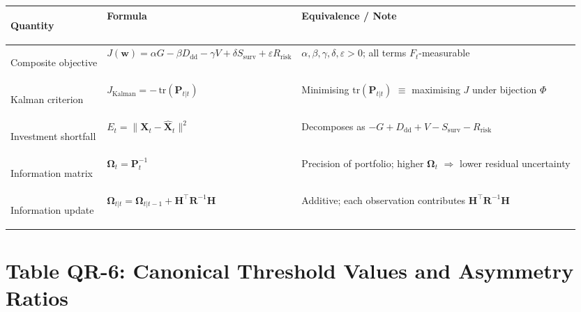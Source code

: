 \documentclass[12pt,openany]{book}
\newcommand{\bfOmega}{\boldsymbol{\Omega}}
\numberwithin{equation}{chapter}
\theoremstyle{plain}
\theoremstyle{definition}
\theoremstyle{remark}
\renewcommand{\arraystretch}{1.2}
\def\mathcal#1{#1}%
\begin{document}
\begin{center}
\small
\renewcommand{\arraystretch}{1.40}
\begin{tabularx}{\linewidth}{@{}
  >{\bfseries\raggedright\arraybackslash}p{3.2cm}
  >{\raggedright\arraybackslash}p{4.6cm}
  >{\raggedright\arraybackslash}X
@{}}
\toprule
Quantity & Formula & Equivalence / Note \\
\midrule
Composite objective &
$J(\mathbf{w}) = \alpha G - \beta D_{\mathrm{dd}} - \gamma V + \delta S_{\mathrm{surv}} + \varepsilon R_{\mathrm{risk}}$ &
$\alpha,\beta,\gamma,\delta,\varepsilon>0$; all terms $\mathcal{F}_t$-measurable \\
Kalman criterion &
$J_{\mathrm{Kalman}} = -\,\mathrm{tr}(\mathbf{P}_{t|t})$ &
Minimising $\mathrm{tr}(\mathbf{P}_{t|t})$ $\equiv$ maximising $J$ under bijection $\Phi$ \\
Investment shortfall &
$\mathcal{E}_t = \|\mathbf{X}_t-\hat{\mathbf{X}}_t\|^2$ &
Decomposes as $-G+D_{\mathrm{dd}}+V-S_{\mathrm{surv}}-R_{\mathrm{risk}}$ \\
Information matrix &
$\bfOmega_t = \mathbf{P}_t^{-1}$ &
Precision of portfolio; higher $\bfOmega_t$ $\Rightarrow$ lower residual uncertainty \\
Information update &
$\bfOmega_{t|t} = \bfOmega_{t|t-1} + \mathbf{H}^\top\mathbf{R}^{-1}\mathbf{H}$ &
Additive; each observation contributes $\mathbf{H}^\top\mathbf{R}^{-1}\mathbf{H}$ \\
\bottomrule
\end{tabularx}
\end{center}

\section*{Table QR-6: Canonical Threshold Values and Asymmetry Ratios}
\end{document}

